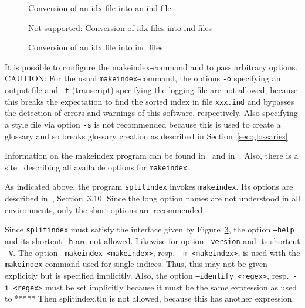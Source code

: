 \begin{figure}[htb]
\centering
{}
\caption{\label{fig:idx2ind}Conversion of an \gls{idx} file into an ind file}
\end{figure}

\begin{figure}[htb]
\centering
{}
\caption{\label{fig:idx2indMult}
Not supported: Conversion of \gls{idx} files into ind files}
\end{figure}

\begin{figure}[htb]
\centering
{}
\caption{\label{fig:idx2indSplit}Conversion of an \gls{idx} file into ind files}
\end{figure}

It is possible to configure the makeindex-command 
and to pass arbitrary options. 
CAUTION\@: For the usual \texttt{makeindex}-command, 
the options \texttt{-o} specifying an output file 
and \texttt{-t} (transcript) specifying the logging file are not allowed, 
because this breaks the expectation to find the sorted index 
in file \texttt{xxx.ind} 
and bypasses the detection of errors and warnings of this software, 
respectively. 
Also specifying a style file via option \texttt{-s} 
is not recommended because this is used to create a glossary 
and so breaks glossary creation 
as described in Section~\ref{sec:glossaries}. 

Information on the makeindex program can be found in~\cite{MkIdxMoe} 
and in~\cite{MkIdxLam}. 
Also, there is a site~\cite{MakeIdxOpts} 
describing all available options for \texttt{makeindex}. 

As indicated above, the program \texttt{splitindex} 
invokes \texttt{makeindex}. 
Its options are described in~\cite{SplitidxP}, Section~3.10. 
Since the long option names are not understood in all environments, 
only the short options are recommended. 

Since \texttt{splitindex} must satisfy the interface 
given by Figure~\ref{fig:idx2indSplit}, 
the option \texttt{--help} and its shortcut \texttt{-h} are not allowed. 
Likewise for option \texttt{--version} and its shortcut \texttt{-V}. 
The option \texttt{--makeindex <makeindex>}, resp.~\texttt{-m <makeindex>}, 
is used with the \texttt{makeindex} command used for single indices. 
Thus, this may not be given explicitly but is specified implicitly. 
Also, the option \texttt{--identify <regex>}, resp.~\texttt{-i <regex>} 
must be set implicitly because it must be the same expression 
as used to ***** 
Then splitindex.tlu is not allowed, 
because this has another expression. 


